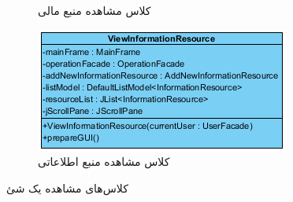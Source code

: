 \begin{figure}[H]
\begin{subfigure}[b]{0.4\textwidth}
		\caption{کلاس مشاهده منبع مالی}
	\end{subfigure}
	\hfill
	\begin{subfigure}[b]{0.4\textwidth}
		\includegraphics[width=\textwidth]{img/class-design/ui/ViewInformationResource}
		\caption{کلاس مشاهده منبع اطلاعاتی}
	\end{subfigure}
	\caption{کلاس‌های مشاهده یک شئ}
\end{figure}


